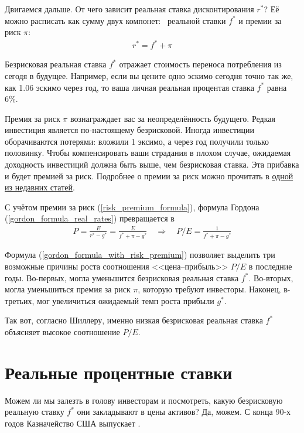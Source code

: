Двигаемся дальше. От чего зависит реальная ставка дисконтирования $r^*$? Её можно расписать как сумму двух компонет: \ реальной ставки $f^*$ и премии за риск $\pi$:
\begin{align}
r^* = f^* + \pi
\label{risk_premium_formula}
\end{align}

Безрисковая реальная ставка $f^*$ отражает стоимость переноса потребления из сегодя в будущее. Например, если вы цените одно эскимо сегодня точно так же, как 1.06 эскимо через год, то ваша личная реальная процентая ставка $f^*$ равна $6\%$.

Премия за риск $\pi$ вознаграждает вас за неопределённость будущего. Редкая инвестиция является по-настоящему безрисковой. Иногда инвестиции оборачиваются потерями: вложили 1 эксимо, а через год получили только половинку. Чтобы компенсировать ваши страдания в плохом случае, ожидаемая доходность инвестиций должна быть выше, чем безрисковая ставка. Эта прибавка и будет премией за риск. Подробнее о премии за риск можно прочитать в \href{https://habr.com/ru/company/dbtc/blog/527050/}{одной из недавних статей}.

С учётом премии за риск (\ref{risk_premium_formula}), формула Гордона (\ref{gordon_formula_real_rates}) превращается в 
\begin{align}
P =\frac{E}{r^* - g^*} = \frac{E}{f^* + \pi - g^*}
\quad
\Rightarrow
\quad
P/E = \frac{1}{f^* + \pi - g^*}
\label{gordon_formula_with_risk_premium}
\end{align}

Формула (\ref{gordon_formula_with_risk_premium}) позволяет выделить три возможные причины роста соотношения <<цена--прибыль>> $P/E$ в последние годы. Во-первых, могла уменьшится безрисковая реальная ставка $f^*$. Во-вторых, могла уменьшиться премия за риск $\pi$, которую требуют инвесторы. Наконец, в-третьих, мог увеличиться ожидаемый темп роста прибыли $g^*$.

Так вот, согласно Шиллеру, именно низкая безрисковая реальная ставка $f^*$ объясняет высокое соотношение $P/E$.

\section{Реальные процентные ставки}

Можем ли мы залезть в голову инвесторам и посмотреть, какую безрисковую реальную ставку $f^*$ они закладывают в цены активов? Да, можем. С конца 90-х годов Казначейство США выпускает .

